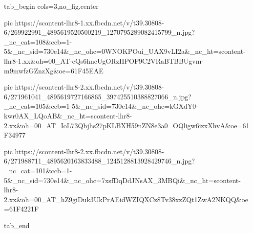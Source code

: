  
 
 
 
 


\ifcmt
  tab_begin cols=3,no_fig,center

     pic https://scontent-lhr8-1.xx.fbcdn.net/v/t39.30808-6/269922991_4895619520500219_1270795289082415799_n.jpg?_nc_cat=108&ccb=1-5&_nc_sid=730e14&_nc_ohc=0WNOKPOui_UAX9vLI2a&_nc_ht=scontent-lhr8-1.xx&oh=00_AT-eQs6hncUgORzHPOF9C2VRaBTBBUgvm-m9mwfzGZnzXg&oe=61F45EAE

     pic https://scontent-lhr8-2.xx.fbcdn.net/v/t39.30808-6/271961041_4895619727166865_397425510388827066_n.jpg?_nc_cat=105&ccb=1-5&_nc_sid=730e14&_nc_ohc=kGXdY0-kwr0AX_LQoAB&_nc_ht=scontent-lhr8-2.xx&oh=00_AT_IoL73Qbjhs27pKLBXH59nZN8e3a0_OQligw6izxXhvA&oe=61F34977

     pic https://scontent-lhr8-2.xx.fbcdn.net/v/t39.30808-6/271988711_4895620163833488_1245128813928429746_n.jpg?_nc_cat=101&ccb=1-5&_nc_sid=730e14&_nc_ohc=7xsfDqDdJNsAX_3MBQi&_nc_ht=scontent-lhr8-2.xx&oh=00_AT_hZ9giDuk3UkPrAEidWZIQXCz8Tv38xzZQt1ZwA2NKQQ&oe=61F4221F

  tab_end
\fi
